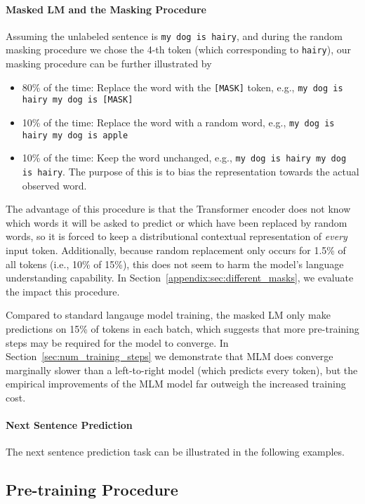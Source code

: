 \documentclass[11pt,a4paper]{article}
\begin{document}
\paragraph{Masked LM and the Masking Procedure} 

Assuming the unlabeled sentence is {\tt {\small my dog is hairy}}, 
and during the random masking procedure we chose the 4-th token (which corresponding to {\tt {\small hairy}}), our masking procedure
can be further illustrated by
\begin{itemize}
\item 80\% of the time: Replace the word with the {\tt [MASK]} token, e.g., {\tt {\small my dog is hairy  my dog is [MASK]}}
\item 10\% of the time: Replace the word with a random word, e.g., {\tt {\small my dog is hairy  my dog is apple}}
\item 10\% of the time: Keep the word unchanged, e.g., {\tt {\small my dog is hairy  my dog is hairy}}. The purpose of this is to bias the representation towards the actual observed word.
\end{itemize}

The advantage of this procedure is that the Transformer encoder does not know which words it will be asked to predict or which have been replaced by random words, so it is forced to keep a distributional contextual representation of {\it every} input token. Additionally, because random replacement only occurs for 1.5\% of all tokens (i.e., 10\% of 15\%), this does not seem to harm the model's language understanding capability. In Section~\ref{appendix:sec:different_masks},
we evaluate the impact this procedure.

Compared to standard langauge model training, the masked LM only
make predictions on 15\% of tokens in each batch, which suggests that more pre-training steps may be required for the model to converge. In Section~\ref{sec:num_training_steps} we demonstrate that MLM does converge marginally slower than a left-to-right model (which predicts every token), but the empirical improvements of the MLM model far outweigh the increased training cost.

\paragraph{Next Sentence Prediction} 

The next sentence prediction task can be illustrated in the following examples.


\subsection{Pre-training Procedure}
\label{sec:pretraining_procedure}
\end{document}
